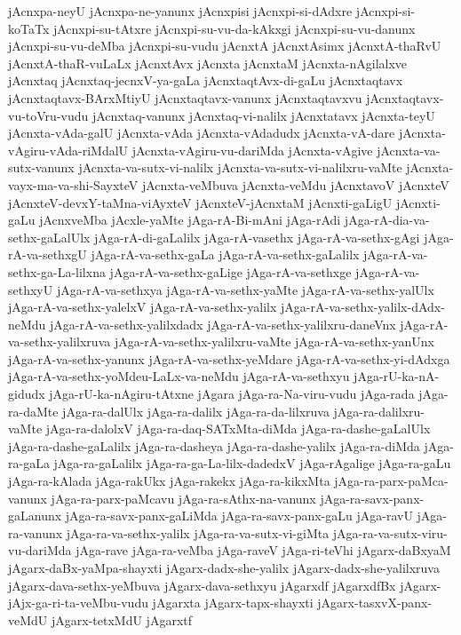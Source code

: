 {jAcnxpa-neyU
jAcnxpa-ne-yanunx
jAcnxpisi
jAcnxpi-si-dAdxre
jAcnxpi-si-koTaTx
jAcnxpi-su-tAtxre
jAcnxpi-su-vu-da-kAkxgi
jAcnxpi-su-vu-danunx
jAcnxpi-su-vu-deMba
jAcnxpi-su-vudu
jAcnxtA
jAcnxtAsimx
jAcnxtA-thaRvU
jAcnxtA-thaR-vuLaLx
jAcnxtAvx
jAcnxta
jAcnxtaM
jAcnxta-nAgilalxve
jAcnxtaq
jAcnxtaq-jecnxV-ya-gaLa
jAcnxtaqtAvx-di-gaLu
jAcnxtaqtavx
jAcnxtaqtavx-BArxMtiyU
jAcnxtaqtavx-vanunx
jAcnxtaqtavxvu
jAcnxtaqtavx-vu-toVru-vudu
jAcnxtaq-vanunx
jAcnxtaq-vi-nalilx
jAcnxtatavx
jAcnxta-teyU
jAcnxta-vAda-galU
jAcnxta-vAda
jAcnxta-vAdadudx
jAcnxta-vA-dare
jAcnxta-vAgiru-vAda-riMdalU
jAcnxta-vAgiru-vu-dariMda
jAcnxta-vAgive
jAcnxta-va-sutx-vanunx
jAcnxta-va-sutx-vi-nalilx
jAcnxta-va-sutx-vi-nalilxru-vaMte
jAcnxta-vayx-ma-va-shi-SayxteV
jAcnxta-veMbuva
jAcnxta-veMdu
jAcnxtavoV
jAcnxteV
jAcnxteV-devxY-taMna-viAyxteV
jAcnxteV-jAcnxtaM
jAcnxti-gaLigU
jAcnxti-gaLu
jAcnxveMba
jAcxle-yaMte
jAga-rA-Bi-mAni
jAga-rAdi
jAga-rA-dia-va-sethx-gaLalUlx
jAga-rA-di-gaLalilx
jAga-rA-vasethx
jAga-rA-va-sethx-gAgi
jAga-rA-va-sethxgU
jAga-rA-va-sethx-gaLa
jAga-rA-va-sethx-gaLalilx
jAga-rA-va-sethx-ga-La-lilxna
jAga-rA-va-sethx-gaLige
jAga-rA-va-sethxge
jAga-rA-va-sethxyU
jAga-rA-va-sethxya
jAga-rA-va-sethx-yaMte
jAga-rA-va-sethx-yalUlx
jAga-rA-va-sethx-yalelxV
jAga-rA-va-sethx-yalilx
jAga-rA-va-sethx-yalilx-dAdx-neMdu
jAga-rA-va-sethx-yalilxdadx
jAga-rA-va-sethx-yalilxru-daneVnx
jAga-rA-va-sethx-yalilxruva
jAga-rA-va-sethx-yalilxru-vaMte
jAga-rA-va-sethx-yanUnx
jAga-rA-va-sethx-yanunx
jAga-rA-va-sethx-yeMdare
jAga-rA-va-sethx-yi-dAdxga
jAga-rA-va-sethx-yoMdeu-LaLx-va-neMdu
jAga-rA-va-sethxyu
jAga-rU-ka-nA-gidudx
jAga-rU-ka-nAgiru-tAtxne
jAgara
jAga-ra-Na-viru-vudu
jAga-rada
jAga-ra-daMte
jAga-ra-dalUlx
jAga-ra-dalilx
jAga-ra-da-lilxruva
jAga-ra-dalilxru-vaMte
jAga-ra-dalolxV
jAga-ra-daq-SATxMta-diMda
jAga-ra-dashe-gaLalUlx
jAga-ra-dashe-gaLalilx
jAga-ra-dasheya
jAga-ra-dashe-yalilx
jAga-ra-diMda
jAga-ra-gaLa
jAga-ra-gaLalilx
jAga-ra-ga-La-lilx-dadedxV
jAga-rAgalige
jAga-ra-gaLu
jAga-ra-kAlada
jAga-rakUkx
jAga-rakekx
jAga-ra-kikxMta
jAga-ra-parx-paMca-vanunx
jAga-ra-parx-paMcavu
jAga-ra-sAthx-na-vanunx
jAga-ra-savx-panx-gaLanunx
jAga-ra-savx-panx-gaLiMda
jAga-ra-savx-panx-gaLu
jAga-ravU
jAga-ra-vanunx
jAga-ra-va-sethx-yalilx
jAga-ra-va-sutx-vi-giMta
jAga-ra-va-sutx-viru-vu-dariMda
jAga-rave
jAga-ra-veMba
jAga-raveV
jAga-ri-teVhi
jAgarx-daBxyaM
jAgarx-daBx-yaMpa-shayxti
jAgarx-dadx-she-yalilx
jAgarx-dadx-she-yalilxruva
jAgarx-dava-sethx-yeMbuva
jAgarx-dava-sethxyu
jAgarxdf
jAgarxdfBx
jAgarx-jAjx-ga-ri-ta-veMbu-vudu
jAgarxta
jAgarx-tapx-shayxti
jAgarx-tasxvX-panx-veMdU
jAgarx-tetxMdU
jAgarxtf
}
